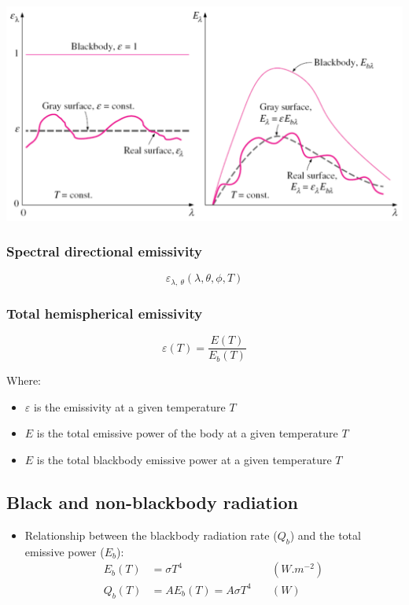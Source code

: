 \documentclass[11pt]{article}
\begin{document}
\begin{center}
\includegraphics[width=.9\linewidth]{./images/gray-and-diffuse-surfaces-graph.png}
\end{center}

\subsubsection{Spectral directional emissivity}
\label{sec:org4bf0cca}
\[\varepsilon_{\lambda, \ \theta} (\lambda, \theta, \phi, T)\]

\subsubsection{Total hemispherical emissivity}
\label{sec:org5634110}
\[\varepsilon (T) = \frac{E(T)}{E_b(T)}\]

Where:
\begin{itemize}
\item \(\varepsilon\) is the emissivity at a given temperature \(T\)
\item \(E\) is the total emissive power of the body at a given temperature \(T\)
\item \(E\) is the total blackbody emissive power at a given temperature \(T\)
\end{itemize}

\subsection{Black and non-blackbody radiation}
\label{sec:org242f428}
\begin{itemize}
\item Relationship between the blackbody radiation rate (\(Q_b\)) and the total emissive power (\(E_b\)):
\begin{align*}
E_b (T) &= \sigma T^4 \quad & (\unit{W.m^{-2}}) \\
Q_b (T) &= AE_b (T) = A \sigma T^4 \quad & (\unit{W})
\end{align*}
\end{itemize}
\end{document}
